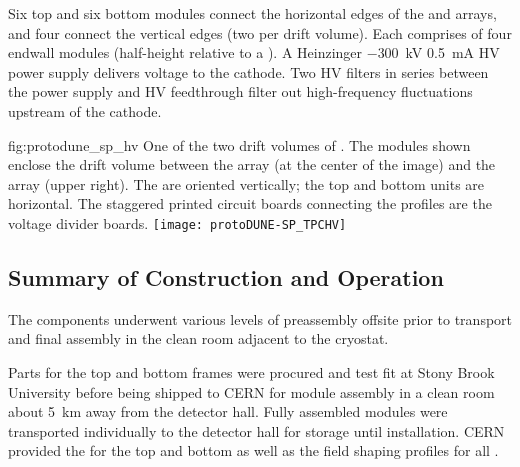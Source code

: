 Six top and six bottom  modules connect the horizontal edges of the  and  arrays, and four %
 connect the vertical edges (two per drift volume).
Each  comprises of four endwall modules (half-height relative to a ).
A Heinzinger $-$\SI{300}{kV} \SI{0.5}{mA} HV power supply delivers voltage to the cathode.
Two HV filters in series between the power supply and HV feedthrough filter out high-frequency fluctuations upstream of the cathode.

\begin{dunefigure}
{fig:protodune_sp_hv}
{One of the two drift volumes of . The  modules shown enclose the drift volume between the  array (at the center of the image) and the  array (upper right). The  are oriented vertically; the top and bottom units are horizontal. The staggered printed circuit boards connecting the  profiles are the voltage divider boards. %
}
\texttt{[image: protoDUNE-SP\_TPCHV]}
\end{dunefigure}

\subsection{Summary of Construction and Operation}
\label{sec:fdsp-hv-protodune-summary}

The   components underwent %
various levels of preassembly offsite prior to transport and final assembly in the  clean room adjacent to the cryostat.

Parts for the top and bottom  frames were procured and test fit at Stony Brook University before being shipped to CERN for module assembly in a clean room about \SI{5}{km} away from the detector hall.
Fully assembled modules were transported individually to the detector hall for storage until installation. CERN provided the  for the top and bottom  as well as the field shaping profiles for all .


